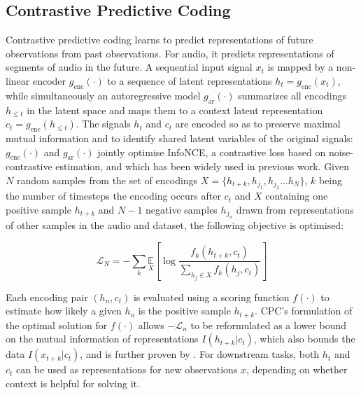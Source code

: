 \documentclass{report}
\begin{document}
\subsection{Contrastive Predictive Coding}
Contrastive predictive coding learns to predict representations of future observations from past observations. For audio, it predicts representations of segments of audio in the future. A sequential input signal $x_t$ is mapped by a non-linear encoder $g_{\mathrm{enc}}(\cdot)$ to a sequence of latent representations $h_t = g_{\mathrm{enc}}(x_t)$, while simultaneously an autoregressive model $g_{\mathrm{ar}}(\cdot)$ summarizes all encodings $h_{\leq t}$ in the latent space and maps them to a context latent representation $c_t = g_{\mathrm{enc}}(h_{\leq t})$. The signals $h_t$ and $c_t$ are encoded so as to preserve maximal mutual information and to identify shared latent variables of the original signals: $g_{\mathrm{enc}}(\cdot)$ and $g_{\mathrm{ar}}(\cdot)$ jointly optimise InfoNCE, a contrastive loss based on noise-contrastive estimation\cite{gutmann_noise-contrastive_nodate}, and which has been widely used in previous work\cite{oord_representation_2019, sohn2020fixmatch, chen_simple_2020}. Given $N$ random samples from the set of encodings $X = \{h_{t+k}, h_{j_1}, h_{j_2} \hdots h_N\}$, $k$ being the number of timesteps the encoding occurs after $c_t$ and $X$ containing one positive sample $h_{t+k}$ and $N-1$ negative samples $h_{j_{n}}$ drawn from representations of other samples in the audio and dataset, the following objective is optimised:

\begin{equation}
    \mathcal{L}_{N}=-\sum_{k} \underset{X}{\mathbb{E}}\left[\log \frac{f_{k}\left(h_{t+k}, c_{t}\right)}{\sum_{h_{j} \in X} f_{k}\left(h_{j}, c_{t}\right)}\right]
\end{equation}

Each encoding pair $(h_n, c_t)$ is evaluated using a scoring function $f(\cdot)$ to estimate how likely a given $h_n$ is the positive sample $h_{t+k}$. CPC's \cite{oord_representation_2019} formulation of the optimal solution for $f(\cdot)$ allows $-\mathcal{L}_n$ to be reformulated as a lower bound on the mutual information of representations $I(h_{t+k} | c_t)$, which also bounds the data $I(x_{t+k} | c_t)$, and is further proven by \cite{poole_variational_2019}. For downstream tasks, both $h_t$ and $c_t$ can be used as representations for new observations $x$, depending on whether context is helpful for solving it. 
\end{document}
